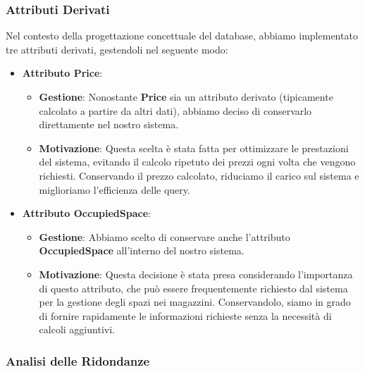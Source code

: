 \subsubsection{Attributi Derivati}

Nel contesto della progettazione concettuale del database, abbiamo implementato tre attributi derivati, gestendoli nel seguente modo:

\begin{itemize}[leftmargin=*,label={\textbullet},itemsep=0pt,topsep=0pt,partopsep=0pt]
    \item \textbf{Attributo Price}:
          \begin{itemize}[leftmargin=*,label={\textbullet},itemsep=0pt,topsep=0pt,partopsep=0pt]
            \item \textbf{Gestione}: Nonostante \textbf{Price} sia un attributo derivato (tipicamente calcolato a partire da altri dati), abbiamo deciso di conservarlo direttamente nel nostro sistema.
            \item \textbf{Motivazione}: Questa scelta è stata fatta per ottimizzare le prestazioni del sistema, evitando il calcolo ripetuto dei prezzi ogni volta che vengono richiesti. Conservando il prezzo calcolato, riduciamo il carico sul sistema e miglioriamo l'efficienza delle query.
          \end{itemize}
    \item \textbf{Attributo OccupiedSpace}:
          \begin{itemize}[leftmargin=*,label={\textbullet},itemsep=0pt,topsep=0pt,partopsep=0pt]
            \item \textbf{Gestione}: Abbiamo scelto di conservare anche l'attributo \textbf{OccupiedSpace} all'interno del nostro sistema.
            \item \textbf{Motivazione}: Questa decisione è stata presa considerando l'importanza di questo attributo, che può essere frequentemente richiesto dal sistema per la gestione degli spazi nei magazzini. Conservandolo, siamo in grado di fornire rapidamente le informazioni richieste senza la necessità di calcoli aggiuntivi.
          \end{itemize}
\end{itemize}

\newpage

\subsubsection{Analisi delle Ridondanze}

